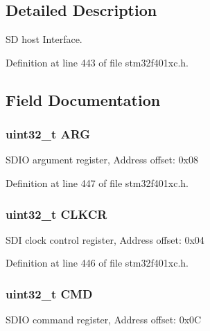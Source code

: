 \subsection{Detailed Description}
SD host Interface. 

Definition at line 443 of file stm32f401xc.\+h.



\subsection{Field Documentation}
\subsubsection[{\texorpdfstring{A\+RG}{ARG}}]{ uint32\+\_\+t A\+RG}\hypertarget{struct_s_d_i_o___type_def_a07d4e63efcbde252c667e64a8d818aa9}{}\label{struct_s_d_i_o___type_def_a07d4e63efcbde252c667e64a8d818aa9}
S\+D\+IO argument register, Address offset\+: 0x08 

Definition at line 447 of file stm32f401xc.\+h.

\subsubsection[{\texorpdfstring{C\+L\+K\+CR}{CLKCR}}]{ uint32\+\_\+t C\+L\+K\+CR}\hypertarget{struct_s_d_i_o___type_def_aa94197378e20fc739d269be49d9c5d40}{}\label{struct_s_d_i_o___type_def_aa94197378e20fc739d269be49d9c5d40}
S\+DI clock control register, Address offset\+: 0x04 

Definition at line 446 of file stm32f401xc.\+h.

\subsubsection[{\texorpdfstring{C\+MD}{CMD}}]{ uint32\+\_\+t C\+MD}\hypertarget{struct_s_d_i_o___type_def_adcf812cbe5147d300507d59d4a55935d}{}\label{struct_s_d_i_o___type_def_adcf812cbe5147d300507d59d4a55935d}
S\+D\+IO command register, Address offset\+: 0x0C 

